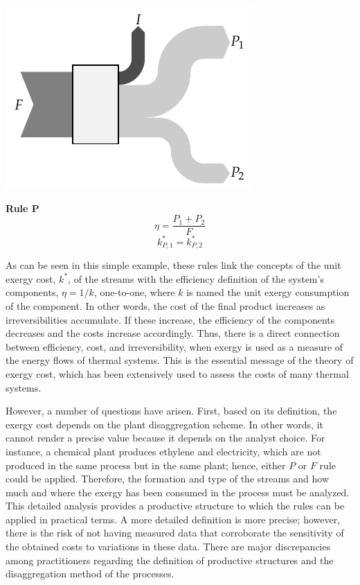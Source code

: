 \documentclass[energies,article,submit,moreauthors,pdftex]{Definitions/mdpi}
\begin{document}
\begin{center}
	\begin{minipage}[c]{0.50\linewidth}
		\includegraphics{reglaP.pdf}
	\end{minipage}
	\begin{minipage}[c]{0.45\linewidth}
		\centering
		\textbf{Rule P}
		\begin{equation*}
		\eta=\frac{P_1+P_2}{F}
		\end{equation*}
		\begin{equation*}
		k_{P,1}^*=k_{P,2}^*
		\end{equation*}
	\end{minipage}
\end{center}

As can be seen in this simple example, these rules link the concepts of the unit exergy cost, $k^*$, of the streams with the efficiency definition of the system's components, $\eta= 1/k$, one-to-one, where $k$ is named the unit exergy consumption of the component. In other words, the cost of the final product increases as irreversibilities accumulate. If these increase, the efficiency of the components decreases and the costs increase accordingly. Thus, there is a direct connection between efficiency, cost, and irreversibility, when exergy is used as a measure of the energy flows of thermal systems. This is the essential message of the theory of exergy cost, which has been extensively used to assess the costs of many thermal systems.

However, a number of questions have arisen. First, based on its definition, the exergy cost depends on the plant disaggregation scheme. In other words, it cannot render a precise value because it depends on the analyst choice. For instance, a chemical plant produces ethylene and electricity, which are not produced in the same process but in the same plant; hence, either $P$ or $F$ rule could be applied. Therefore, the formation and type of the streams and how much and where the exergy has been consumed in the process must be analyzed. This detailed analysis provides a productive structure to which the rules can be applied in practical terms. A more detailed definition is more precise; however, there is the risk of not having measured data that corroborate the sensitivity of the obtained costs to variations in these data. There are major discrepancies among practitioners regarding the definition of productive structures and the disaggregation method of the processes.
\end{document}
